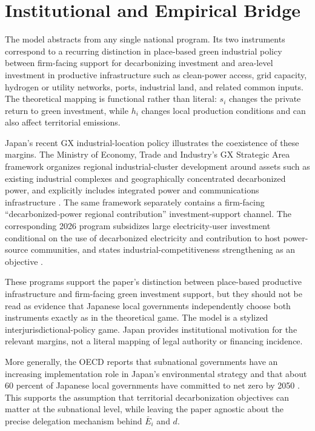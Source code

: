 \section{Institutional and Empirical Bridge}
\label{sec:institutional}

The model abstracts from any single national program. Its two instruments correspond to a recurring distinction in place-based green industrial policy between firm-facing support for decarbonizing investment and area-level investment in productive infrastructure such as clean-power access, grid capacity, hydrogen or utility networks, ports, industrial land, and related common inputs. The theoretical mapping is functional rather than literal: $s_i$ changes the private return to green investment, while $h_i$ changes local production conditions and can also affect territorial emissions.

Japan's recent GX industrial-location policy illustrates the coexistence of these margins. The Ministry of Economy, Trade and Industry's GX Strategic Area framework organizes regional industrial-cluster development around assets such as existing industrial complexes and geographically concentrated decarbonized power, and explicitly includes integrated power and communications infrastructure \citep{METIGX2026}. The same framework separately contains a firm-facing ``decarbonized-power regional contribution'' investment-support channel. The corresponding 2026 program subsidizes large electricity-user investment conditional on the use of decarbonized electricity and contribution to host power-source communities, and states industrial-competitiveness strengthening as an objective \citep{METIGXSubsidy2026}.

These programs support the paper's distinction between place-based productive infrastructure and firm-facing green investment support, but they should not be read as evidence that Japanese local governments independently choose both instruments exactly as in the theoretical game. The model is a stylized interjurisdictional-policy game. Japan provides institutional motivation for the relevant margins, not a literal mapping of legal authority or financing incidence.

More generally, the OECD reports that subnational governments have an increasing implementation role in Japan's environmental strategy and that about 60 percent of Japanese local governments have committed to net zero by 2050 \citep{OECDJapan2025}. This supports the assumption that territorial decarbonization objectives can matter at the subnational level, while leaving the paper agnostic about the precise delegation mechanism behind $\bar E_i$ and $d$.

